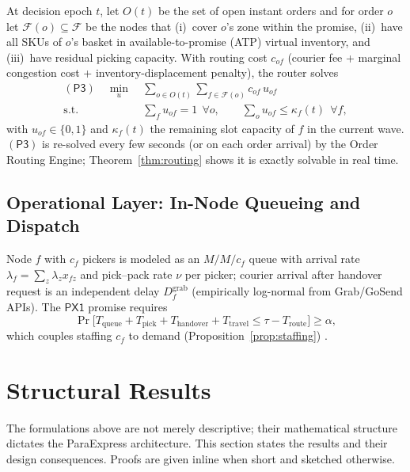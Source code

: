 \documentclass[journal]{IEEEtran}
\begin{document}
At decision epoch $t$, let $O(t)$ be the set of open instant orders and for order $o$ let $\mathcal{F}(o) \subseteq \mathcal{F}$ be the nodes that (i)~cover $o$'s zone within the promise, (ii)~have all SKUs of $o$'s basket in available-to-promise (ATP) virtual inventory, and (iii)~have residual picking capacity. With routing cost $c_{of}$ (courier fee + marginal congestion cost + inventory-displacement penalty), the router solves
\begin{equation}
\label{eq:p3}
\begin{split}
(\mathsf{P3})\quad \min_{u}\ & \sum_{o \in O(t)} \sum_{f \in \mathcal{F}(o)} c_{of}\, u_{of} \\
\text{s.t.}\ & \textstyle\sum_{f} u_{of} = 1 \ \ \forall o, \qquad \textstyle\sum_{o} u_{of} \le \kappa_f(t) \ \ \forall f,
\end{split}
\end{equation}
with $u_{of} \in \{0,1\}$ and $\kappa_f(t)$ the remaining slot capacity of $f$ in the current wave. $(\mathsf{P3})$ is re-solved every few seconds (or on each order arrival) by the Order Routing Engine; Theorem~\ref{thm:routing} shows it is exactly solvable in real time.

\subsection{Operational Layer: In-Node Queueing and Dispatch}

Node $f$ with $c_f$ pickers is modeled as an $M/M/c_f$ queue with arrival rate $\lambda_f = \sum_z \lambda_z x_{fz}$ and pick--pack rate $\nu$ per picker; courier arrival after handover request is an independent delay $D^{\mathrm{grab}}_f$ (empirically log-normal from Grab/GoSend APIs). The $\mathsf{PX1}$ promise requires
\begin{equation}
\label{eq:slaqueue}
\Pr\!\big[T_{\mathrm{queue}} + T_{\mathrm{pick}} + T_{\mathrm{handover}} + T_{\mathrm{travel}} \le \tau - T_{\mathrm{route}}\big] \ge \alpha,
\end{equation}
which couples staffing $c_f$ to demand (Proposition~\ref{prop:staffing}) \cite{halfin,dekoster}.

\section{Structural Results}
\label{sec:theory}
The formulations above are not merely descriptive; their mathematical structure dictates the ParaExpress architecture. This section states the results and their design consequences. Proofs are given inline when short and sketched otherwise.
\end{document}
